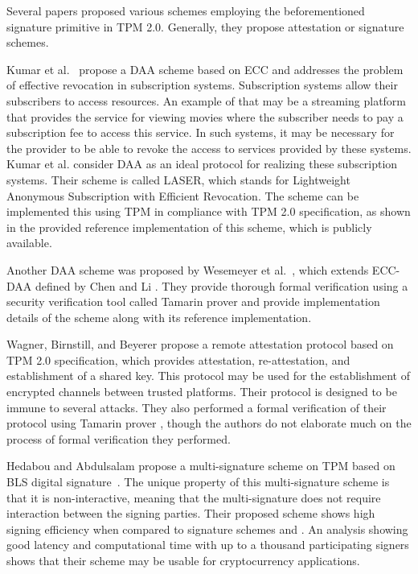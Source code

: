 Several papers proposed various schemes employing the beforementioned signature primitive in TPM 2.0. Generally, they propose attestation or signature schemes.

Kumar et al.~\cite{kumar2018direct} propose a DAA scheme based on ECC and addresses the problem of effective revocation in subscription systems. Subscription systems allow their subscribers to access resources. An example of that may be a streaming platform that provides the service for viewing movies where the subscriber needs to pay a subscription fee to access this service. In such systems, it may be necessary for the provider to be able to revoke the access to services provided by these systems. Kumar et al. consider DAA as an ideal protocol for realizing these subscription systems. Their scheme is called LASER, which stands for Lightweight Anonymous Subscription with Efficient Revocation. The scheme can be implemented this using TPM in compliance with TPM 2.0 specification, as shown in the provided reference implementation of this scheme, which is publicly available. 

Another DAA scheme was proposed by Wesemeyer et al.~\cite{wesemeyerDAA}, which extends ECC-DAA defined by Chen and Li \cite{chen2013flexible}. They provide thorough formal verification using a security verification tool called Tamarin prover \cite{meier2013tamarin} and provide implementation details of the scheme along with its reference implementation.

Wagner, Birnstill, and Beyerer \cite{wagnerRemoteAttProtocol} propose a remote attestation protocol based on TPM 2.0 specification, which provides attestation, re-attestation, and establishment of a shared key. This protocol may be used for the establishment of encrypted channels between trusted platforms. Their protocol is designed to be immune to several attacks. They also performed a formal verification of their protocol using Tamarin prover \cite{meier2013tamarin}, though the authors do not elaborate much on the process of formal verification they performed.

Hedabou and Abdulsalam \cite{hedabou2020efficient} propose a multi-signature scheme on TPM based on BLS digital signature~\cite{blsSignatures}. The unique property of this multi-signature scheme is that it is non-interactive, meaning that the multi-signature does not require interaction between the signing parties. Their proposed scheme shows high signing efficiency when compared to signature schemes \cite{chen2013flexible} and \cite{schnorrSpec}. An analysis showing good latency and computational time with up to a thousand participating signers shows that their scheme may be usable for cryptocurrency applications.

